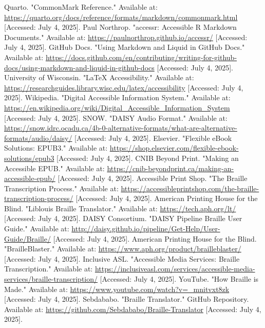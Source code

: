 \begin{thebibliography}{99}
	 Quarto. "CommonMark Reference." Available at: \url{https://quarto.org/docs/reference/formats/markdown/commonmark.html} [Accessed: July 4, 2025].
	 Paul Northrop. "accessr: Accessible R Markdown Documents." Available at: \url{https://paulnorthrop.github.io/accessr/} [Accessed: July 4, 2025].
	 GitHub Docs. "Using Markdown and Liquid in GitHub Docs." Available at: \url{https://docs.github.com/en/contributing/writing-for-github-docs/using-markdown-and-liquid-in-github-docs} [Accessed: July 4, 2025].
	 University of Wisconsin. "LaTeX Accessibility." Available at: \url{https://researchguides.library.wisc.edu/latex/accessibility} [Accessed: July 4, 2025].
	 Wikipedia. "Digital Accessible Information System." Available at: \url{https://en.wikipedia.org/wiki/Digital_Accessible_Information_System} [Accessed: July 4, 2025].
	 SNOW. "DAISY Audio Format." Available at: \url{https://snow.idrc.ocadu.ca/4b-0-alternative-formats/what-are-alternative-formats/audio/daisy/} [Accessed: July 4, 2025].
	 Elsevier. "Flexible eBook Solutions: EPUB3." Available at: \url{https://shop.elsevier.com/flexible-ebook-solutions/epub3} [Accessed: July 4, 2025].
	 CNIB Beyond Print. "Making an Accessible EPUB." Available at: \url{https://cnib-beyondprint.ca/making-an-accessible-epub/} [Accessed: July 4, 2025].
	 Accessible Print Shop. "The Braille Transcription Process." Available at: \url{https://accessibleprintshop.com/the-braille-transcription-process/} [Accessed: July 4, 2025].
	 American Printing House for the Blind. "Liblouis Braille Translator." Available at: \url{https://tech.aph.org/lt/} [Accessed: July 4, 2025].
	 DAISY Consortium. "DAISY Pipeline Braille User Guide." Available at: \url{http://daisy.github.io/pipeline/Get-Help/User-Guide/Braille/} [Accessed: July 4, 2025].
	 American Printing House for the Blind. "BrailleBlaster." Available at: \url{https://www.aph.org/product/brailleblaster/} [Accessed: July 4, 2025].
	 Inclusive ASL. "Accessible Media Services: Braille Transcription." Available at: \url{https://inclusiveasl.com/services/accessible-media-services/braille-transcription/} [Accessed: July 4, 2025].
	 YouTube. "How Braille is Made." Available at: \url{https://www.youtube.com/watch?v=_mnitvxt8zk} [Accessed: July 4, 2025].
	 Sebdababo. "Braille Translator." GitHub Repository. Available at: \url{https://github.com/Sebdababo/Braille-Translator} [Accessed: July 4, 2025].

\end{thebibliography}
